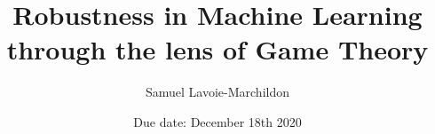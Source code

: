 \documentclass{article}
\title{Robustness in Machine Learning through the lens of Game Theory}
\author{Samuel Lavoie-Marchildon}
\date{Due date: December 18th 2020}
\begin{document}
\maketitle
\doublespacing








\end{document}
